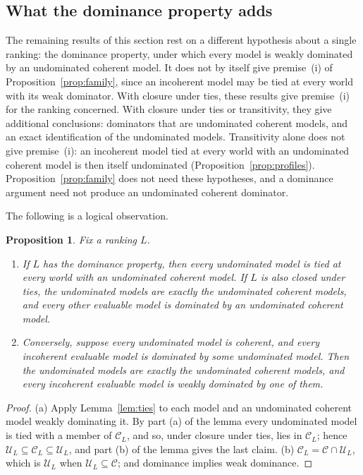 \documentclass[11pt]{article}
\newtheorem{proposition}[theorem]{Proposition}
\theoremstyle{definition}
\theoremstyle{remark}
\newcommand{\C}{\mathcal C}
\newcommand{\U}{\mathcal U}
\begin{document}
\subsection{What the dominance property adds}
The remaining results of this section rest on a different hypothesis about a single ranking: the dominance property, under which every model is weakly dominated by an undominated coherent model. It does not by itself give premise~(i) of Proposition~\ref{prop:family}, since an incoherent model may be tied at every world with its weak dominator. With closure under ties, these results give premise~(i) for the ranking concerned. With closure under ties or transitivity, they give additional conclusions: dominators that are undominated coherent models, and an exact identification of the undominated models. Transitivity alone does not give premise~(i): an incoherent model tied at every world with an undominated coherent model is then itself undominated (Proposition~\ref{prop:profiles}). Proposition~\ref{prop:family} does not need these hypotheses, and a dominance argument need not produce an undominated coherent dominator.

The following is a logical observation.
\begin{proposition}\label{prop:conclusion}
Fix a ranking $L$.
\begin{enumerate}[label=(\alph*)]
\item If $L$ has the dominance property, then every undominated model is tied at every world with an undominated coherent model. If $L$ is also closed under ties, the undominated models are exactly the undominated coherent models, and every other evaluable model is dominated by an undominated coherent model.
\item Conversely, suppose every undominated model is coherent, and every incoherent evaluable model is dominated by some undominated model. Then the undominated models are exactly the undominated coherent models, and every incoherent evaluable model is weakly dominated by one of them.
\end{enumerate}
\end{proposition}
\begin{proof}
(a) Apply Lemma~\ref{lem:ties} to each model and an undominated coherent model weakly dominating it. By part (a) of the lemma every undominated model is tied with a member of $\C_L$, and so, under closure under ties, lies in $\C_L$; hence $\U_L\subseteq\C_L\subseteq\U_L$, and part (b) of the lemma gives the last claim.
(b) $\C_L=\C\cap\U_L$, which is $\U_L$ when $\U_L\subseteq\C$; and dominance implies weak dominance.
\end{proof}
\end{document}
